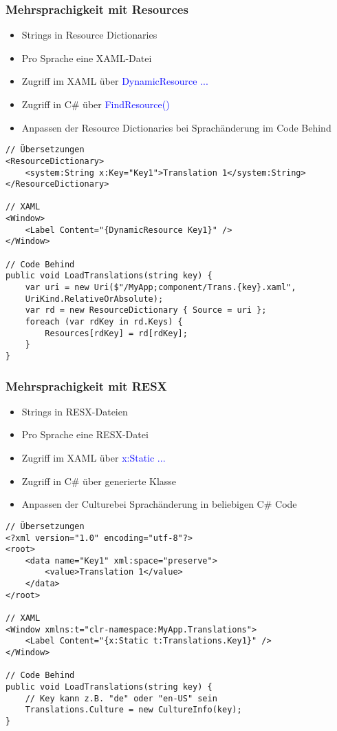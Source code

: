 \subsubsection{Mehrsprachigkeit mit Resources}
\begin{itemize}[topsep=0pt, leftmargin=4mm]
    \setlength\itemsep{-0.3em}
    \item Strings in Resource Dictionaries
    \item Pro Sprache eine XAML-Datei
    \item Zugriff im XAML über \textcolor{blue}{{DynamicResource ... }}
    \item Zugriff in C\# über \textcolor{blue}{FindResource()}
    \item Anpassen der Resource Dictionaries bei Sprachänderung im Code Behind
\end{itemize}
\begin{lstlisting}
// Übersetzungen
<ResourceDictionary>
    <system:String x:Key="Key1">Translation 1</system:String>
</ResourceDictionary>

// XAML
<Window>
    <Label Content="{DynamicResource Key1}" />
</Window>

// Code Behind
public void LoadTranslations(string key) {
    var uri = new Uri($"/MyApp;component/Trans.{key}.xaml",
    UriKind.RelativeOrAbsolute);
    var rd = new ResourceDictionary { Source = uri };
    foreach (var rdKey in rd.Keys) {
        Resources[rdKey] = rd[rdKey];
    }
}
\end{lstlisting}
\subsubsection{Mehrsprachigkeit mit RESX}
\begin{itemize}[topsep=0pt, leftmargin=4mm]
    \setlength\itemsep{-0.3em}
    \item Strings in RESX-Dateien
    \item Pro Sprache eine RESX-Datei
    \item Zugriff im XAML über \textcolor{blue}{{x:Static ... }}
    \item Zugriff in C\# über generierte Klasse
    \item Anpassen der \dq Culture\dq bei Sprachänderung in beliebigen C\# Code
\end{itemize}
\begin{lstlisting}
// Übersetzungen
<?xml version="1.0" encoding="utf-8"?>
<root>
    <data name="Key1" xml:space="preserve">
        <value>Translation 1</value>
    </data>
</root>

// XAML
<Window xmlns:t="clr-namespace:MyApp.Translations">
    <Label Content="{x:Static t:Translations.Key1}" />
</Window>

// Code Behind
public void LoadTranslations(string key) {
    // Key kann z.B. "de" oder "en-US" sein
    Translations.Culture = new CultureInfo(key);
}
\end{lstlisting}
